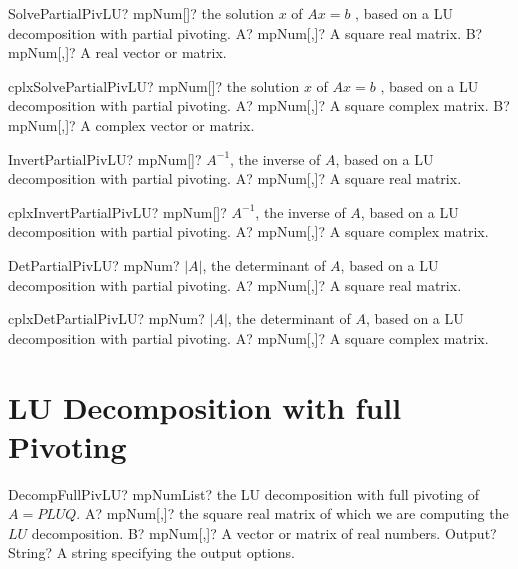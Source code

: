 \documentclass[12pt,a4paper,openany]{book}
\begin{document}
\begin{mpFunctionsExtract}
\mpFunctionTwo
{SolvePartialPivLU? mpNum[]? the solution $x$ of $A x = b$ , based on a LU decomposition with partial pivoting.}
{A? mpNum[,]? A square real matrix.}
{B? mpNum[,]? A real vector or matrix.}
\end{mpFunctionsExtract}

\begin{mpFunctionsExtract}
\mpFunctionTwo
{cplxSolvePartialPivLU? mpNum[]? the solution $x$ of $A x = b$ , based on a LU decomposition with partial pivoting.}
{A? mpNum[,]? A square complex matrix.}
{B? mpNum[,]? A complex vector or matrix.}
\end{mpFunctionsExtract}

\begin{mpFunctionsExtract}
\mpFunctionOne
{InvertPartialPivLU? mpNum[]? $A^{-1}$, the inverse of $A$, based on a LU decomposition with partial pivoting.}
{A? mpNum[,]? A square real matrix.}
\end{mpFunctionsExtract}

\begin{mpFunctionsExtract}
\mpFunctionOne
{cplxInvertPartialPivLU? mpNum[]? $A^{-1}$, the inverse of $A$, based on a LU decomposition with partial pivoting.}
{A? mpNum[,]? A square complex matrix.}
\end{mpFunctionsExtract}

\begin{mpFunctionsExtract}
\mpFunctionOne
{DetPartialPivLU? mpNum? $|A|$, the determinant of $A$, based on a LU decomposition with partial pivoting.}
{A? mpNum[,]? A square real matrix.}
\end{mpFunctionsExtract}

\begin{mpFunctionsExtract}
\mpFunctionOne
{cplxDetPartialPivLU? mpNum? $|A|$, the determinant of $A$, based on a LU decomposition with partial pivoting.}
{A? mpNum[,]? A square complex matrix.}
\end{mpFunctionsExtract}

\section{LU Decomposition with full Pivoting}

\begin{mpFunctionsExtract}
\mpFunctionThree
{DecompFullPivLU? mpNumList? the LU decomposition with full pivoting of $A = PLUQ$.}
{A? mpNum[,]? the square real matrix of which we are computing the $LU$ decomposition.}
{B? mpNum[,]? A vector or matrix of real numbers.}
{Output? String? A string specifying the output options.}
\end{mpFunctionsExtract}
\end{document}
